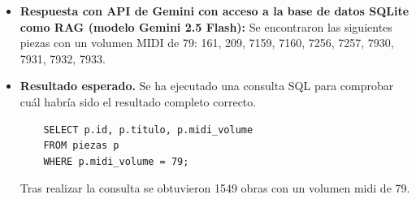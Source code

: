 \begin{itemize}
Si estas son las notas que estás buscando, te proporciono sus detalles:

* Duración: 85
* Valor MIDI: 71
* Nota: E
* Octava: 4
* Instrumento: P1-I1
* Voz: 1
* Estaff: 1

O

* Duración: 86
* Valor MIDI: 72
* Nota: A
* Octava: 4
* Instrumento: P1-I1
* Voz: 1
* Estaff: 1

Es importante destacar que la relación entre duraciones en tiempo común y valores MIDI no es siempre exacta, y puede variar dependiendo del contexto y de las especificaciones del archivo MIDI."
    \item \textbf{Respuesta con API de Gemini con acceso a la base de datos SQLite como RAG (modelo Gemini 2.5 Flash):} Se encontraron las siguientes piezas con un volumen MIDI de 79: 161, 209, 7159, 7160, 7256, 7257, 7930, 7931, 7932, 7933.
    \item \textbf{Resultado esperado.} Se ha ejecutado una consulta SQL para comprobar cuál habría sido el resultado completo correcto.
    \begin{verbatim}
    SELECT p.id, p.titulo, p.midi_volume
    FROM piezas p
    WHERE p.midi_volume = 79;
    \end{verbatim}  
    Tras realizar la consulta se obtuvieron 1549 obras con un volumen midi de 79.  

\end{itemize}


